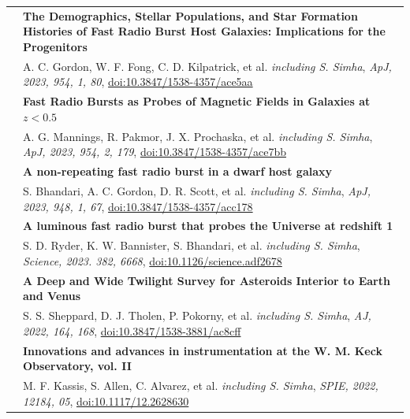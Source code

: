 \documentclass[letterpaper, 11pt]{article}
\begin{document}
\begin{longtable}{p{1.3in}p{4.8in}}
& \textbf{The Demographics, Stellar Populations, and Star Formation Histories of Fast Radio Burst Host Galaxies: Implications for the Progenitors} \\
& A. C. Gordon, W. F. Fong, C. D. Kilpatrick, et al. \textit{including S. Simha}, \textit{ApJ, 2023, 954, 1, 80}, \href{https://ui.adsabs.harvard.edu/link_gateway/2023ApJ...954...80G/doi:10.3847/1538-4357/ace5aa}{doi:10.3847/1538-4357/ace5aa}\\
& \textbf{Fast Radio Bursts as Probes of Magnetic Fields in Galaxies at $z < 0.5$ } \\
&  A. G. Mannings, R. Pakmor, J. X. Prochaska, et al. \textit{including S. Simha}, \textit{ApJ, 2023, 954, 2, 179}, \href{https://ui.adsabs.harvard.edu/link_gateway/2023ApJ...954..179M/doi:10.3847/1538-4357/ace7bb}{doi:10.3847/1538-4357/ace7bb}\\
& \textbf{A non-repeating fast radio burst in a dwarf host galaxy} \\
& S. Bhandari, A. C. Gordon, D. R. Scott, et al. \textit{including S. Simha}, \textit{ApJ, 2023, 948, 1, 67}, \href{https://ui.adsabs.harvard.edu/link_gateway/2023ApJ...948...67B/doi:10.3847/1538-4357/acc178}{doi:10.3847/1538-4357/acc178}\\

& \textbf{A luminous fast radio burst that probes the Universe at redshift 1 } \\
&  S. D. Ryder, K. W. Bannister, S. Bhandari, et al. \textit{including S. Simha}, \textit{Science, 2023.  382, 6668}, \href{https://ui.adsabs.harvard.edu/link_gateway/2023Sci...382..294R/doi:10.1126/science.adf2678}{doi:10.1126/science.adf2678}\\

& \textbf{A Deep and Wide Twilight Survey for Asteroids Interior to Earth and Venus } \\
&  S. S. Sheppard, D. J. Tholen, P. Pokorny, et al. \textit{including S. Simha}, \textit{AJ, 2022, 164, 168}, \href{https://ui.adsabs.harvard.edu/link_gateway/2022AJ....164..168S/doi:10.3847/1538-3881/ac8cff}{doi:10.3847/1538-3881/ac8cff}\\

& \textbf{Innovations and advances in instrumentation at the W. M. Keck Observatory, vol. II} \\
&  M. F. Kassis, S. Allen, C. Alvarez, et al. \textit{including S. Simha}, \textit{SPIE, 2022, 12184, 05}, \href{https://ui.adsabs.harvard.edu/link_gateway/2022SPIE12184E..05K/doi:10.1117/12.2628630}{doi:10.1117/12.2628630}\\


\end{longtable}
\end{document}
